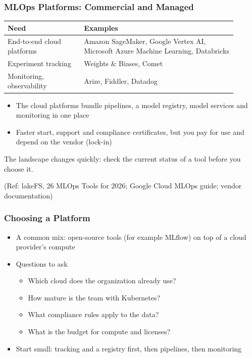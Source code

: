 \begin{frame}[fragile]\frametitle{MLOps Platforms: Commercial and Managed}
\begin{center}
\small\renewcommand{\arraystretch}{1.35}
\begin{tabular}{>{\raggedright\arraybackslash}p{0.3\linewidth}>{\raggedright\arraybackslash}p{0.6\linewidth}}
\hline
\textbf{Need} & \textbf{Examples} \\
\hline
End-to-end cloud platforms & Amazon SageMaker, Google Vertex AI, Microsoft Azure Machine Learning, Databricks \\
Experiment tracking & Weights \& Biases, Comet \\
Monitoring, observability & Arize, Fiddler, Datadog \\
\hline
\end{tabular}
\end{center}
\begin{itemize}
\item The cloud platforms bundle pipelines, a model registry, model services and monitoring in one place
\item Faster start, support and compliance certificates, but you pay for use and depend on the vendor (lock-in)
\end{itemize}
The landscape changes quickly: check the current status of a tool before you choose it.

{\tiny (Ref: lakeFS, 26 MLOps Tools for 2026; Google Cloud MLOps guide; vendor documentation)}
\end{frame}

\begin{frame}[fragile]\frametitle{Choosing a Platform}
\begin{itemize}
\item A common mix: open-source tools (for example MLflow) on top of a cloud provider's compute
\item Questions to ask
\begin{itemize}
\item Which cloud does the organization already use?
\item How mature is the team with Kubernetes?
\item What compliance rules apply to the data?
\item What is the budget for compute and licenses?
\end{itemize}
\item Start small: tracking and a registry first, then pipelines, then monitoring
\end{itemize}
\end{frame}

